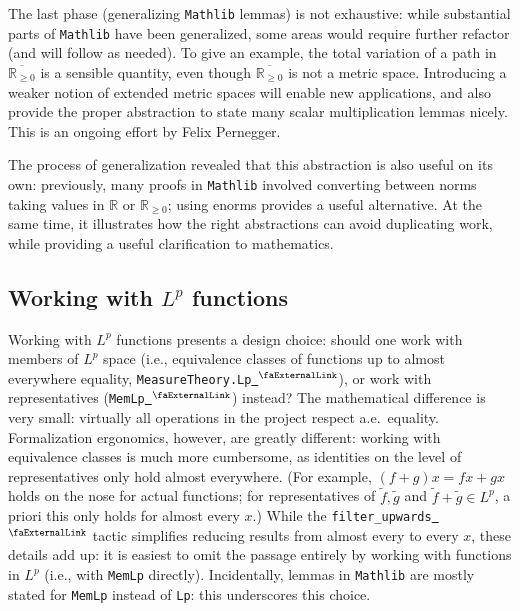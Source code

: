 \documentclass[12pt]{amsart}
\newcommand{\lean}[1]{\lstinline{#1}}
\newcommand*{\real}{\mathbb{R}} %
\newcommand{\nnreal}{\real_{\ge0}}
\newcommand{\ennreal}{\overline{\real_{\ge0}}}
\newcommand{\mathlib}{\texttt{Mathlib}\xspace}
\newcommand{\extlink}{~\ensuremath{{}^\text{\faExternalLink}}}
\theoremstyle{definition}
\theoremstyle{plain}
\begin{document}
The last phase (generalizing \mathlib lemmas) is not exhaustive: while substantial parts of \mathlib have been generalized, some areas would require further refactor (and will follow as needed). To give an example, the total variation of a path in $\ennreal$ is a sensible quantity, even though $\ennreal$ is not a metric space. Introducing a weaker notion of extended metric spaces will enable new applications, and also provide the proper abstraction to state many scalar multiplication lemmas nicely. This is an ongoing effort by Felix Pernegger.

The process of generalization revealed that this abstraction is also useful on its own: previously, many proofs in \mathlib involved converting between norms taking values in $\real$ or $\nnreal$; using enorms provides a useful alternative. At the same time, it illustrates how the right abstractions can avoid duplicating work, while providing a useful clarification to mathematics.

\subsection{Working with \texorpdfstring{$L^p$}{L\^{}p} functions}\label{subsec:Lp}

Working with $L^p$ functions presents a design choice: should one work with members of $L^p$ space (i.e., equivalence classes of functions up to almost everywhere equality, \lean{MeasureTheory.Lp}\href{https://github.com/leanprover-community/mathlib4/blob/44ea3a0e13339f31231dde209c4f8196e179065d/Mathlib/MeasureTheory/Function/LpSpace/Basic.lean#L88-L96}{\extlink}), or work with representatives (\lean{MemLp}\href{https://github.com/leanprover-community/mathlib4/blob/44ea3a0e13339f31231dde209c4f8196e179065d/Mathlib/MeasureTheory/Function/LpSeminorm/Defs.lean#L116-L119}{\extlink}) instead?
The mathematical difference is very small: virtually all operations in the project respect a.e.\ equality.
Formalization ergonomics, however, are greatly different: working with equivalence classes is much more cumbersome, as identities on the level of representatives only hold almost everywhere.
(For example, $(f+g)x = f x + g x$ holds on the nose for actual functions; for representatives of $\tilde{f},\tilde{g}$ and $\tilde{f}+\tilde{g}\in L^p$, a priori this only holds for almost every $x$.)
While the \lean{filter_upwards}\href{https://github.com/leanprover-community/mathlib4/blob/81a5d257c8e410db227a6665ed08f64fea08e997/Mathlib/Order/Filter/Defs.lean#L444}{\extlink} tactic simplifies reducing results from almost every to every $x$, these details add up: it is easiest to omit the passage entirely by working with functions in $L^p$ (i.e., with \lean{MemLp} directly).
Incidentally, lemmas in \mathlib are mostly stated for \lean{MemLp} instead of \lean{Lp}: this underscores this choice.
\end{document}
